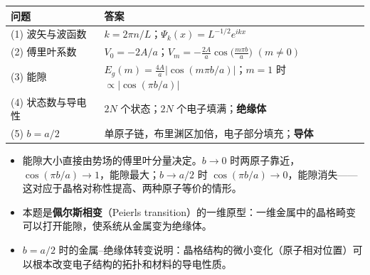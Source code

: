 \begin{formulabox}[答案汇总]
\begin{center}
\begin{tabular}{ll}
\toprule
\textbf{问题} & \textbf{答案} \\
\midrule
(1) 波矢与波函数 & $k=2\pi n/L$；$\Psi_k(x)=L^{-1/2}e^{ikx}$ \\
(2) 傅里叶系数 & $V_0=-2A/a$；$V_m=-\frac{2A}{a}\cos\bigl(\frac{m\pi b}{a}\bigr)$ $(m\neq0)$ \\
(3) 能隙 & $E_g(m)=\frac{4A}{a}|\cos(m\pi b/a)|$；$m=1$ 时 $\propto|\cos(\pi b/a)|$ \\
(4) 状态数与导电性 & $2N$ 个状态；$2N$ 个电子填满；\textbf{绝缘体} \\
(5) $b=a/2$ & 单原子链，布里渊区加倍，电子部分填充；\textbf{导体} \\
\bottomrule
\end{tabular}
\end{center}
\end{formulabox}

\begin{insightbox}[物理图像]
\begin{itemize}
    \item 能隙大小直接由势场的傅里叶分量决定。$b\to0$ 时两原子靠近，$\cos(\pi b/a)\to1$，能隙最大；$b\to a/2$ 时 $\cos(\pi b/a)\to0$，能隙消失——这对应于晶格对称性提高、两种原子等价的情形。
    \item 本题是\textbf{佩尔斯相变}（Peierls transition）的一维原型：一维金属中的晶格畸变可以打开能隙，使系统从金属变为绝缘体。
    \item $b=a/2$ 时的金属--绝缘体转变说明：晶格结构的微小变化（原子相对位置）可以根本改变电子结构的拓扑和材料的导电性质。
\end{itemize}
\end{insightbox}
